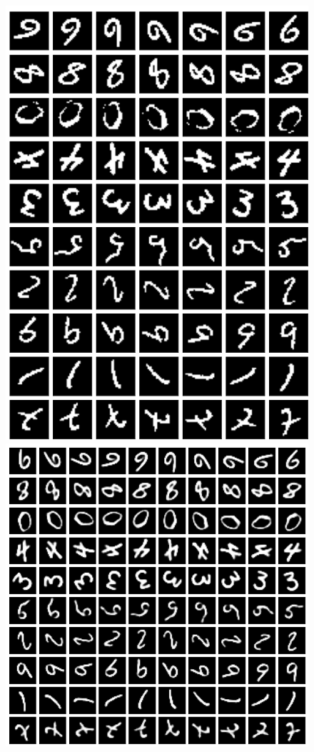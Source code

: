 \begin{frame}
\begin{figure}[h!]
\begin{minipage}{0.26\textwidth}
			\includegraphics[scale=0.19]{Bilder/MNISTorig2}
	\end{minipage}
	\begin{minipage}{0.35\textwidth}
			\center{}
			\includegraphics[scale=0.19]{Bilder/MNISTrec}

\end{minipage}
\end{figure}
\end{frame}
